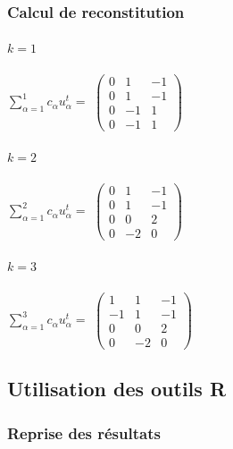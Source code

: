 \documentclass[a4paper,11pt]{article}
\begin{document}
\subsubsection{Calcul de reconstitution} 

\paragraph{$k=1$}

\begin{center}$\displaystyle\sum_{\alpha =1}^{1} c_{\alpha} u_{\alpha}^{t} =$ 
$\begin{pmatrix}
0&1&-1\\
0&1&-1\\
0&-1&1\\
0&-1&1
\end{pmatrix}$
\end{center}

\paragraph{$k=2$}

\begin{center} $\displaystyle\sum_{\alpha =1}^{2} c_{\alpha} u_{\alpha}^{t} = $
$\begin{pmatrix}
0&1&-1\\
0&1&-1\\
0&0&2\\
0&-2&0
\end{pmatrix}$
\end{center}

\paragraph{$k=3$}

\begin{center} $\displaystyle\sum_{\alpha =1}^{3} c_{\alpha} u_{\alpha}^{t} = $
$\begin{pmatrix}
1&1&-1\\
-1&1&-1\\
0&0&2\\
0&-2&0
\end{pmatrix}$
\end{center}

\subsection{Utilisation des outils R}
\subsubsection{Reprise des résultats}
\end{document}

